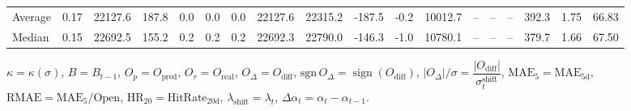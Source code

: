 \begin{threeparttable}
{\begin{tabular}{lrrrrrrrrrrrrrrrrr}
Average &     0.17 & 22127.6 &             187.8 &               0.0 &                0.0 &                0.0 & 22127.6 & 22315.2 &     -187.5 &                     -0.2 &             10012.7 &         -- &        -- &             -- &            392.3 &            1.75 &                  66.83 \\
 Median &     0.15 & 22692.5 &             155.2 &               0.2 &                0.2 &                0.2 & 22692.3 & 22790.0 &     -146.3 &                     -1.0 &             10780.1 &         -- &        -- &             -- &            379.7 &            1.66 &                  67.50 \\
\bottomrule
\end{tabular}
}
\begin{tablenotes}\footnotesize
\item $\kappa=\kappa(\sigma)$, $B=B_{t-1}$, $O_p=O_{\text{pred}}$, $O_r=O_{\text{real}}$, $O_\Delta=O_{\text{diff}}$, $\mathrm{sgn}\,O_\Delta=\operatorname{sign}(O_{\text{diff}})$, $|O_\Delta|/\sigma=\dfrac{|O_{\text{diff}}|}{\sigma_t^{\text{shift}}}$, $\mathrm{MAE}_5=\mathrm{MAE}_{5\text{d}}$, $\mathrm{RMAE}= \mathrm{MAE}_5 / \text{Open}$, $\mathrm{HR}_{20}=\mathrm{HitRate}_{20\text{d}}$, 
$\lambda_{\text{shift}}=\lambda_t$, 
$\Delta\alpha_t=\alpha_t-\alpha_{t-1}$.
\end{tablenotes}
\end{threeparttable}
\endgroup

